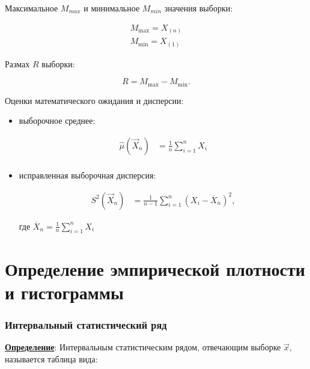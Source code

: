 Максимальное $M_{max}$ и минимальное $M_{min}$ значения выборки:

\begin{equation}
    \begin{aligned}
        M_{\max} = X_{(n)}\\
        M_{\min} = X_{(1)}
    \end{aligned}
\end{equation}



Размах $R$ выборки:

\begin{equation}
    R = M_{\max} - M_{\min}.
\end{equation}


Оценки математического ожидания и дисперсии:

\begin{itemize}
    \item выборочное среднее:

    \begin{equation}
        \begin{aligned}
        \hat\mu(\vec X_n) &= \frac 1n \sum_{i=1}^n X_i\\
        \end{aligned}
    \end{equation}
    
    \item исправленная выборочная дисперсия:

    \begin{equation}
        \begin{aligned}
        S^2(\vec X_n) &= \frac 1{n-1} \sum_{i=1}^n (X_i-\overline X_n)^2,
        \end{aligned}
    \end{equation}

    где $\overline X_n = \frac 1n \sum_{i=1}^n X_i$

\end{itemize}


\section{Определение эмпирической плотности и гистограммы}

\subsubsection{Интервальный статистический ряд}

\textbf{\underline{Определение}}: Интервальным статистическим рядом, отвечающим выборке $\vec x$, называется таблица вида:

